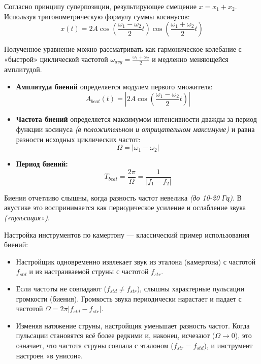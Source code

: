 Согласно принципу суперпозиции, результирующее смещение $x = x_1 + x_2$. Используя тригонометрическую формулу суммы косинусов:
\[
x(t) = 2A \cos\left( \frac{\omega_1 - \omega_2}{2}t \right) \cos\left( \frac{\omega_1 + \omega_2}{2}t \right)
\]

Полученное уравнение можно рассматривать как гармоническое колебание с «быстрой» циклической частотой $\omega_{avg} = \frac{\omega_1 + \omega_2}{2}$ и медленно меняющейся амплитудой.

\begin{itemize}
    \item \textbf{Амплитуда биений} определяется модулем первого множителя:
    \[
    A_{beat}(t) = \left| 2A \cos\left( \frac{\omega_1 - \omega_2}{2}t \right) \right|
    \]
    
    \item \textbf{Частота биений} определяется максимумом интенсивности дважды за период функции косинуса \textit{(в положительном и отрицательном максимуме)} и равна разности исходных циклических частот:
    \[
    \Omega = |\omega_1 - \omega_2|
    \]
    
    \item \textbf{Период биений:} 
    \[
    T_{beat} = \frac{2\pi}{\Omega} = \frac{1}{|f_1 - f_2|}
    \]
\end{itemize}

Биения отчетливо слышны, когда разность частот невелика \textit{(до 10-20 Гц)}. В акустике это воспринимается как периодическое усиление и ослабление звука \textit{(«пульсация»)}.

Настройка инструментов по камертону — классический пример использования биений:
\begin{itemize}
    \item Настройщик одновременно извлекает звук из эталона (камертона) с частотой $f_{std}$ и из настраиваемой струны с частотой $f_{str}$.
    \item Если частоты не совпадают ($f_{std} \neq f_{str}$), слышны характерные пульсации громкости (биения). Громкость звука периодически нарастает и падает с частотой $\Omega = 2\pi|f_{std} - f_{str}|$.
    \item Изменяя натяжение струны, настройщик уменьшает разность частот. Когда пульсации становятся всё более редкими и, наконец, исчезают ($\Omega \to 0$), это означает, что частота струны совпала с эталоном ($f_{str} = f_{std}$), и инструмент настроен «в унисон».
\end{itemize}